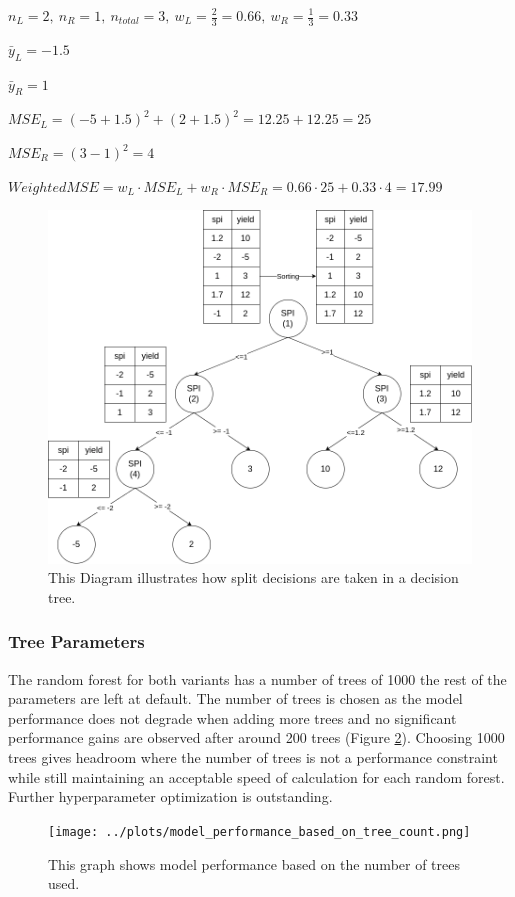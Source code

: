 \documentclass{article}
\begin{document}
$n_L = 2, \ n_R = 1, \ n_{total} = 3, \ w_L = \frac{2}{3} = 0.66, \ w_R = \frac{1}{3} = 0.33$

$\bar{y}_L = -1.5$

$\bar{y}_R = 1$

$MSE_L = (-5 + 1.5)^2 + (2 + 1.5)^2 = 12.25 + 12.25 = 25$

$MSE_R = (3 - 1)^2 = 4$

$Weighted MSE = w_L \cdot MSE_L + w_R \cdot MSE_R = 0.66 \cdot 25 + 0.33 \cdot 4 = 17.99$

\begin{figure}[H]
	\centering
	\includegraphics[width=1.0\textwidth]{./plots/DecisionTreeSplit.png}
	\caption{\label{fig:decision_tree_split}This Diagram illustrates how split decisions are taken in a decision tree.}
\end{figure}
\noindent
\subsubsection{Tree Parameters}
The random forest for both variants has a number of trees of 1000 the rest of the parameters are left at default.
The number of trees is chosen as the model performance does not degrade when adding more trees and no significant performance gains are observed after around 200 trees (Figure \ref{fig:n_trees_vs_performance}). Choosing 1000 trees gives headroom where the number of trees is not a performance constraint while still maintaining an acceptable speed of calculation for each random forest.
Further hyperparameter optimization is outstanding.
\begin{figure}[H]
	\centering
	\texttt{[image: ../plots/model\_performance\_based\_on\_tree\_count.png]}
	\caption{\label{fig:n_trees_vs_performance}This graph shows model performance based on the number of trees used.}
\end{figure}
\end{document}
